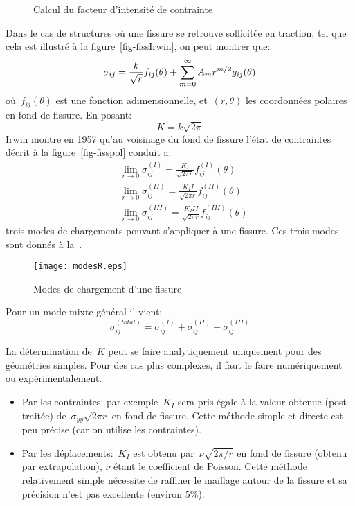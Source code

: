 \begin{figure}[ht]\centering
{}\hspace{6em}
\caption{Calcul du facteur d'intensité de contrainte}
\end{figure}
Dans le cas de structures où une fissure se retrouve sollicitée en traction, tel que cela est illustré à la figure~\ref{fig-fissIrwin},
on peut montrer que:
\begin{equation} \sigma_{ij} = \frac{k}{\sqrt{r}} f_{ij}(\theta) + \displaystyle\sum_{m=0}^\infty A_m r^{m/2} g_{ij}(\theta) \end{equation}
où~$f_{ij}(\theta)$ est une fonction adimensionnelle, et~$(r, \theta)$ les coordonnées polaires en fond
de fissure.
En posant:
\begin{equation} K = k\sqrt{2\pi} \end{equation}
Irwin montre en 1957 qu'au voisinage du fond de
fissure l'état de contraintes décrit à la figure~\ref{fig-fisspol} conduit a:
\begin{align}
&\lim_{r\rightarrow0} \sigma_{ij}^{(I)} = \frac{K_I}{\sqrt{2\pi r}} f_{ij}^{(I)}(\theta) \\
&\lim_{r\rightarrow0} \sigma_{ij}^{(II)} = \frac{K_II}{\sqrt{2\pi r}} f_{ij}^{(II)}(\theta) \\
&\lim_{r\rightarrow0} \sigma_{ij}^{(III)} = \frac{K_III}{\sqrt{2\pi r}} f_{ij}^{(III)}(\theta)
\end{align}
trois modes de chargements pouvant s'appliquer à une fissure. Ces trois modes sont donnés à la~.
\begin{figure}[htb]
\centering\texttt{[image: modesR.eps]}
\caption{Modes de chargement d'une fissure}\label{fig-modesR}
\end{figure}

\medskip
Pour un mode mixte général il vient:
\begin{equation} \sigma_{ij}^{(total)} = \sigma_{ij}^{(I)} + \sigma_{ij}^{(II)} + \sigma_{ij}^{(III)} \end{equation}


\medskip{}
La détermination de~$K$ peut se faire analytiquement uniquement pour des géométries simples.
Pour des cas plus complexes, il faut le faire numériquement ou expérimentalement.
\begin{itemize}
\item Par les contraintes: par exemple~$K_I$ sera pris égale à la valeur obtenue (post-traitée)
de~$\sigma_{yy}\sqrt{2\pi r}$ en fond de fissure. Cette méthode simple et directe est peu
précise (car on utilise les contraintes).
\item Par les déplacements:~$K_I$ est obtenu par~$\nu \sqrt{2\pi/r}$ en fond de fissure (obtenu
par extrapolation), $\nu$ étant le coefficient de Poisson.
Cette méthode relativement simple nécessite de raffiner le maillage
autour de la fissure et sa précision n'est pas excellente (environ 5\%).
\end{itemize}

